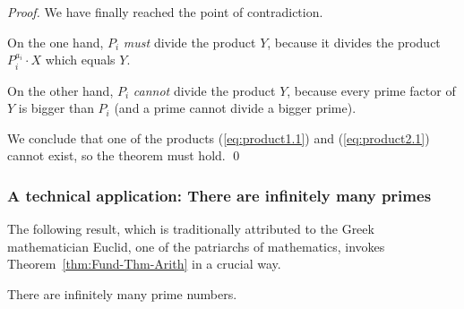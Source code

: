 \begin{proof}
We have finally reached the point of contradiction.

On the one hand, $P_i$ {\em must} divide the product $Y$, because it
divides the product $P_i^{a_i} \cdot X$ which equals $Y$.

On the other hand, $P_i$ {\em cannot} divide the product $Y$, because
every prime factor of $Y$ is bigger than $P_i$ (and a prime cannot
divide a bigger prime).

We conclude that one of the products (\ref{eq:product1.1}) and
(\ref{eq:product2.1}) cannot exist, so the theorem must hold.  \qed
\end{proof}



\subsubsection{A technical application: There are infinitely many primes}
\label{sec:infinite-primes}

The following result, which is traditionally attributed to the Greek
mathematician Euclid,  one of the patriarchs of
mathematics, invokes Theorem~\ref{thm:Fund-Thm-Arith} in a crucial
way.

\begin{prop}
\label{thm:infinite-primes}
There are infinitely many prime numbers.
\end{prop}

